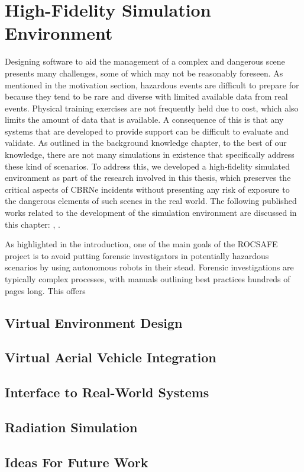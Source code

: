 \chapter{High-Fidelity Simulation Environment}
\workinprogress
Designing software to aid the management of a complex and dangerous scene presents many challenges, some of which may not be reasonably foreseen. As mentioned in the motivation section, hazardous events are difficult to prepare for because they tend to be rare and diverse with limited available data from real events. Physical training exercises are not frequently held due to cost, which also limits the amount of data that is available. A consequence of this is that any systems that are developed to provide support can be difficult to evaluate and validate. As outlined in the background knowledge chapter, to the best of our knowledge, there are not many simulations in existence that specifically address these kind of scenarios. To address this, we developed a high-fidelity simulated environment as part of the research involved in this thesis, which preserves the critical aspects of CBRNe incidents without presenting any risk of exposure to the dangerous elements of such scenes in the real world. The following published works related to the development of the simulation environment are discussed in this chapter: \citet{Smyth2018AInvestigation}, \citet{Smyth2018UsingDrones}.\par

As highlighted in the introduction, one of the main goals of the ROCSAFE project \cite{rocsafeNUIG} is to avoid putting forensic investigators in potentially hazardous scenarios by using autonomous robots in their stead. Forensic investigations are typically complex processes, with manuals outlining best practices hundreds of pages long. This offers 


\section{Virtual Environment Design}


\section{Virtual Aerial Vehicle Integration}


\section{Interface to Real-World Systems}

\section{Radiation Simulation}

\section{Ideas For Future Work}